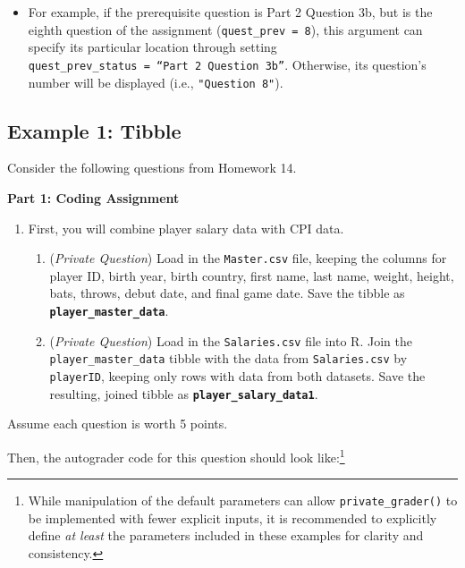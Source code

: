 \documentclass[
  12pt,
]{book}
\providecommand{\tightlist}{%
  \setlength{\itemsep}{0pt}\setlength{\parskip}{0pt}}
\begin{document}
\begin{itemize}
\tightlist
\item
  For example, if the prerequisite question is Part 2 Question 3b, but is the eighth question of the assignment (\texttt{quest\_prev\ =\ 8}), this argument can specify its particular location through setting \texttt{quest\_prev\_status\ =\ “Part\ 2\ Question\ 3b”}. Otherwise, its question's number will be displayed (i.e., \texttt{"Question\ 8"}).
\end{itemize}

\subsection*{Example 1: Tibble}\label{example-1-tibble}

Consider the following questions from Homework 14.

\textbf{Part 1: Coding Assignment}

\begin{enumerate}
\def\labelenumi{\arabic{enumi}.}
\item
  First, you will combine player salary data with CPI data.

  \begin{enumerate}
  \def\labelenumii{(\alph{enumii})}
  \item
    (\emph{Private Question}) Load in the \texttt{Master.csv} file, keeping the columns for player ID, birth year, birth country, first name, last name, weight, height, bats, throws, debut date, and final game date. Save the tibble as \textbf{\texttt{player\_master\_data}}.
  \item
    (\emph{Private Question}) Load in the \texttt{Salaries.csv} file into R. Join the \texttt{player\_master\_data} tibble with the data from \texttt{Salaries.csv} by \texttt{playerID}, keeping only rows with data from both datasets. Save the resulting, joined tibble as \textbf{\texttt{player\_salary\_data1}}.
  \end{enumerate}
\end{enumerate}

Assume each question is worth 5 points.

Then, the autograder code for this question should look like:\footnote{While manipulation of the default parameters can allow \texttt{private\_grader()} to be implemented with fewer explicit inputs, it is recommended to explicitly define \emph{at least} the parameters included in these examples for clarity and consistency.}
\end{document}
